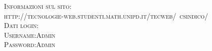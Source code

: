 \documentclass[12pt]{article}
\begin{document}
\begin{titlepage}
		
		\textsc{\Large Informazioni sul sito:}\\[0.3cm]	
		\textsc{http://tecnologie-web.studenti.math.unipd.it/tecweb/~csindico/}\\[1cm]
		
		
			\textsc{\Large Dati login:}\\[0.3cm]
			\textsc{ Username:Admin}\\[0.1mm]
			\textsc{ Password:Admin}\\[0.1mm]
			
		\vfill
	\end{titlepage}
	
	\newpage
	\renewcommand{\contentsname}{Indice}
	\tableofcontents
	
	
	\newpage
	
\end{document}
